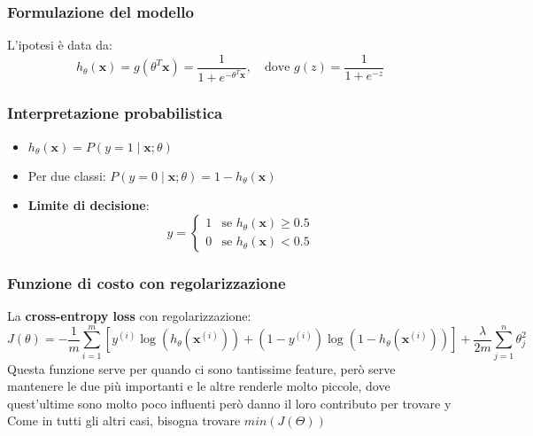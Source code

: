 \documentclass[10pt,oneside,a4paper]{article}
\begin{document}
	\subsubsection{Formulazione del modello}
	L'ipotesi è data da:
	\[
	h_\theta(\mathbf{x}) = g(\theta^T \mathbf{x}) = \frac{1}{1 + e^{-\theta^T \mathbf{x}}}, \quad \text{dove } g(z) = \frac{1}{1+e^{-z}}
	\]
	\subsubsection{Interpretazione probabilistica}
	\begin{itemize}
		\item $h_\theta(\mathbf{x}) = P(y=1 \mid \mathbf{x}; \theta)$
		\item Per due classi: $P(y=0 \mid \mathbf{x}; \theta) = 1 - h_\theta(\mathbf{x})$
		\item \textbf{Limite di decisione}: 
		\[
		y = 
		\begin{cases}
			1 & \text{se } h_\theta(\mathbf{x}) \geq 0.5 \\
			0 & \text{se } h_\theta(\mathbf{x}) < 0.5
		\end{cases}
		\]
	\end{itemize}
	
	\subsubsection{Funzione di costo con regolarizzazione}
	La \textbf{cross-entropy loss} con regolarizzazione:
	\[
	J(\theta) = -\frac{1}{m} \sum_{i=1}^m \left[ y^{(i)} \log(h_\theta(\mathbf{x}^{(i)})) + (1-y^{(i)}) \log(1 - h_\theta(\mathbf{x}^{(i)})) \right] + \frac{\lambda}{2m} \sum_{j=1}^n \theta_j^2
	\]
	Questa funzione serve per quando ci sono tantissime feature, però serve mantenere le due più importanti e le altre renderle molto piccole, dove quest'ultime sono molto poco influenti però danno il loro contributo per trovare y\\
	Come in tutti gli altri casi, bisogna trovare $min(J(\Theta))$
	
\end{document}
